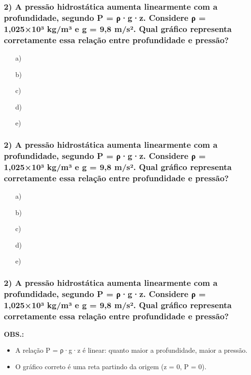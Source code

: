 \documentclass[12pt]{beamer}
\begin{document}
\begin{frame}
\frametitle{2) A pressão hidrostática aumenta linearmente com a profundidade, segundo P = ρ·g·z. Considere ρ = 1,025×10³ kg/m³ e g = 9,8 m/s². Qual gráfico representa corretamente essa relação entre profundidade e pressão?}
{\BodySize
\begin{itemize}
\item[a)] \fbox{\rule{0pt}{4cm}\rule{6cm}{0pt}}
\item[b)] \fbox{\rule{0pt}{4cm}\rule{6cm}{0pt}}
\item[c)] \fbox{\rule{0pt}{4cm}\rule{6cm}{0pt}}
\item[d)] \fbox{\rule{0pt}{4cm}\rule{6cm}{0pt}}
\item[e)] \fbox{\rule{0pt}{4cm}\rule{6cm}{0pt}}
\end{itemize}
}
\end{frame}

\begin{frame}
\frametitle{2) A pressão hidrostática aumenta linearmente com a profundidade, segundo P = ρ·g·z. Considere ρ = 1,025×10³ kg/m³ e g = 9,8 m/s². Qual gráfico representa corretamente essa relação entre profundidade e pressão?}
{\BodySize
\begin{itemize}
\item[a)] \fbox{\rule{0pt}{4cm}\rule{6cm}{0pt}}
\item[b)] \fbox{\rule{0pt}{4cm}\rule{6cm}{0pt}}
\item[c)] \fbox{\rule{0pt}{4cm}\rule{6cm}{0pt}}
\item[d)] \fbox{\rule{0pt}{4cm}\rule{6cm}{0pt}}
\item[e)] \fbox{\rule{0pt}{4cm}\rule{6cm}{0pt}}
\end{itemize}
}
\end{frame}

\begin{frame}
\frametitle{2) A pressão hidrostática aumenta linearmente com a profundidade, segundo P = ρ·g·z. Considere ρ = 1,025×10³ kg/m³ e g = 9,8 m/s². Qual gráfico representa corretamente essa relação entre profundidade e pressão?}
{\BodySize
\textbf{OBS.:}
\begin{itemize}
\item A relação P = ρ·g·z é linear: quanto maior a profundidade, maior a pressão.
\item O gráfico correto é uma reta partindo da origem (z = 0, P = 0).
\end{itemize}
}
\end{frame}
\end{document}
